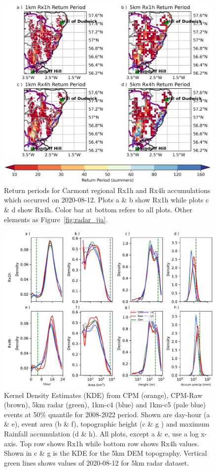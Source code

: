 \documentclass[11pt,a4paper]{article}
\begin{document}
\begin{figure}
	\centering
	\includegraphics[width=\linewidth]{map_return_prds}
	\caption{Return periods for Carmont regional Rx1h and Rx4h accumulations which occurred on 2020-08-12. Plots a \& b show Rx1h while plots c \& d show Rx4h. Color bar at bottom refers to all plots. Other elements as Figure~\ref{fig:radar_jja}. } 
	\label{fig:map_rtn_prd}
\end{figure}


\begin{figure}
	\centering
	\includegraphics[width=\linewidth]{kde_smooth_events}
	\caption{Kernel Density Estimates (KDE) from  CPM (orange), CPM-Raw (brown), 5km radar (green), 1km-c4 (blue) and 1km-c5 (pale blue) events at 50\% quantile for 2008-2022 period.
		 Shown are day-hour (a \& e), event area (b \& f),  topographic height (c \& g ) and maximum Rainfall accumulation (d \& h). All plots, except a \& e, use a log x-axis. 
		  Top row shows Rx1h while bottom row shows Rx4h values. Shown in c \& g is the KDE for the 5km DEM topography. Vertical green lines shows values of 2020-08-12 for 5km radar dataset.}
	\label{fig:kde_smooth_events}
\end{figure}
\end{document}
